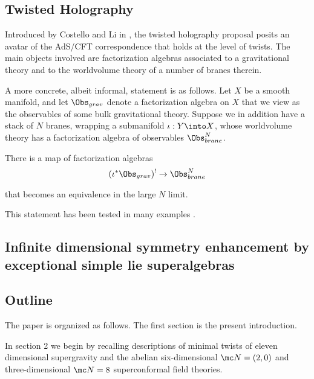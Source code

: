 \subsection{Twisted Holography}
Introduced by Costello and Li in \cite{CLsugra}, the twisted holography proposal posits an avatar of the AdS/CFT correspondence that holds at the level of twists. The main objects involved are factorization algebras associated to a gravitational theory and to the worldvolume theory of a number of branes therein.

A more concrete, albeit informal, statement is as follows. Let $X$ be a smooth manifold, and let $\Obs_{grav}$ denote a factorization algebra on $X$ that we view as the observables of some bulk gravitational theory. Suppose we in addition have a stack of $N$ branes, wrapping a submanifold $\iota: Y\into X$, whose worldvolume theory has a factorization algebra of observables $\Obs^{N}_{brane}$.

\begin{}
  There is a map of factorization algebras
  \[
        (\iota^{*}\Obs_{grav})^{!}\to \Obs^{N}_{brane}
  \]

      that becomes an equivalence in the large $N$ limit.
    \end{}

    This statement has been tested in many examples \cite{}.


\subsection{Infinite dimensional symmetry enhancement by exceptional simple lie superalgebras}

\subsection{Outline}

The paper is organized as follows. The first section is the present introduction.

In section 2 we begin by recalling descriptions of minimal twists of eleven dimensional supergravity \cite{} and the abelian six-dimensional $\mc N=(2,0)$ \cite{} and three-dimensional $\mc N=8$ \cite{} superconformal field theories.

%
